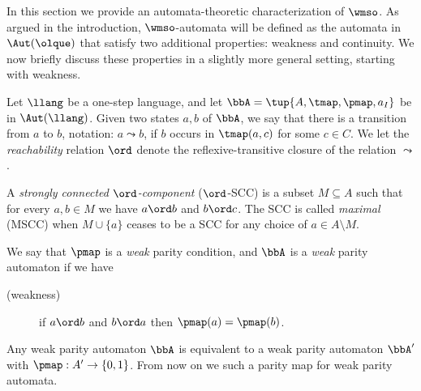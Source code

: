 In this section we provide an automata-theoretic characterization of $\wmso$.
As argued in the introduction, $\wmso$-automata will be defined as the
automata in $\Aut(\olque)$ that satisfy two additional properties: weakness
and continuity.
We now briefly discuss these properties in a slightly more general setting,
starting with weakness.

\begin{definition}
\label{def:weak}
Let $\llang$ be a one-step language, and let $\bbA = \tup{A,\tmap,\pmap,a_I}$
be in $\Aut(\llang)$.
Given two states $a,b$ of $\bbA$,
we say that there is a transition from $a$ to $b$, notation: $a \leadsto b$,
if $b$ occurs in $\tmap(a,c)$ for some $c \in C$.
We let the \emph{reachability} relation $\ord$ denote the reflexive-transitive
closure of the relation $\leadsto$.

A \emph{strongly connected $\ord$-component} ($\ord$-SCC) is a subset $M\subseteq A$ such that for every $a,b \in M$ we have $a \ord b$ and $b \ord c$. The SCC is called \emph{maximal} (MSCC) when $M\cup\{a\}$ ceases to be a SCC for any choice of $a \in A\setminus M$.

We say that $\pmap$ is a \emph{weak} parity condition, and $\bbA$ is a
\emph{weak} parity automaton if we have
\begin{description}
\item[(weakness)] if $a \ord b$ and $b \ord a$ then $\pmap(a) = \pmap(b)$.
\end{description}
\end{definition}
\begin{comment}
\btbs
\item
story: weakness corresponds to noetherian projection
\item
Ex: \eqref{eq-wfmso} in introduction states that over the class of all
trees, the weak $\ofoe$-automata correspond to the $\mso$-variant
$\yvnmso$, where quantification is restricted to noetherian subsets.
\etbs
\end{comment}

\begin{remark}
Any weak parity automaton $\bbA$ is equivalent to a weak parity automaton
$\bbA'$ with $\pmap: A' \to \{0,1\}$. From now on we such a parity map for weak parity automata.
\end{remark}

